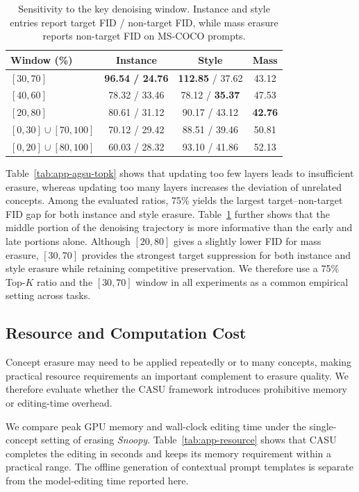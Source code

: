 \documentclass[letterpaper]{article} %
\begin{document}
\begin{table}[t]
\centering
\scriptsize
\setlength{\tabcolsep}{3pt}
\caption{Sensitivity to the key denoising window. Instance and style entries report target FID / non-target FID, while mass erasure reports non-target FID on MS-COCO prompts.}
\label{tab:app-agsu-window}
\begin{tabular}{lccc}
\toprule
Window (\%) & Instance & Style & Mass \\
\midrule
$[30,70]$
& \textbf{96.54 / 24.76}
& \textbf{112.85} / 37.62
& 43.12 \\
$[40,60]$
& 78.32 / 33.46
& 78.12 / \textbf{35.37}
& 47.53 \\
$[20,80]$
& 80.61 / 31.12
& 90.17 / 43.12
& \textbf{42.76} \\
$[0,30]\cup[70,100]$
& 70.12 / 29.42
& 88.51 / 39.46
& 50.81 \\
$[0,20]\cup[80,100]$
& 60.03 / 28.32
& 93.10 / 41.86
& 52.13 \\
\bottomrule
\end{tabular}
\end{table}

Table~\ref{tab:app-agsu-topk} shows that updating too few layers leads to insufficient erasure, whereas updating too many layers increases the deviation of unrelated concepts. Among the evaluated ratios, 75\% yields the largest target--non-target FID gap for both instance and style erasure. Table~\ref{tab:app-agsu-window} further shows that the middle portion of the denoising trajectory is more informative than the early and late portions alone. Although $[20,80]$ gives a slightly lower FID for mass erasure, $[30,70]$ provides the strongest target suppression for both instance and style erasure while retaining competitive preservation. We therefore use a 75\% Top-$K$ ratio and the $[30,70]$ window in all experiments as a common empirical setting across tasks.

\subsection{Resource and Computation Cost}

Concept erasure may need to be applied repeatedly or to many concepts, making practical resource requirements an important complement to erasure quality. We therefore evaluate whether the CASU framework introduces prohibitive memory or editing-time overhead.

We compare peak GPU memory and wall-clock editing time under the single-concept setting of erasing \emph{Snoopy}.  Table~\ref{tab:app-resource} shows that CASU completes the editing in seconds and keeps its memory requirement within a practical range. The offline generation of contextual prompt templates is separate from the model-editing time reported here.
\end{document}
